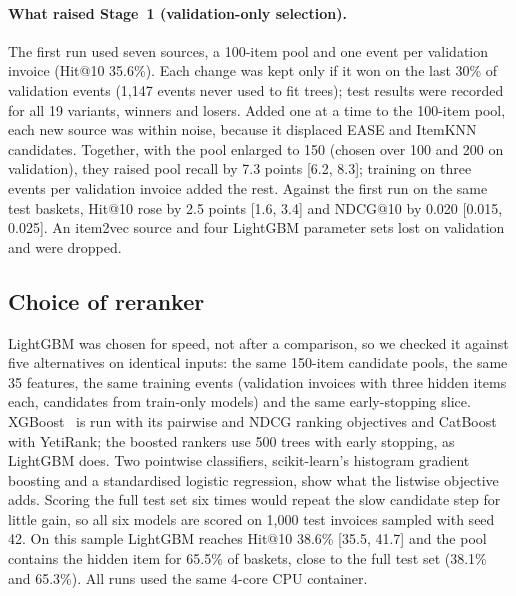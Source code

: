 \documentclass[11pt]{article}
\begin{document}
\paragraph{What raised Stage~1 (validation-only selection).}\label{sec:accuracy}
The first run used seven sources, a 100-item pool and one event per validation invoice (Hit@10 35.6\%).
Each change was kept only if it won on the last 30\% of validation events (1,147 events never used to fit trees); test results were recorded for all 19 variants, winners and losers.
Added one at a time to the 100-item pool, each new source was within noise, because it displaced EASE and ItemKNN candidates.
Together, with the pool enlarged to 150 (chosen over 100 and 200 on validation), they raised pool recall by 7.3 points [6.2, 8.3]; training on three events per validation invoice added the rest.
Against the first run on the same test baskets, Hit@10 rose by 2.5 points [1.6, 3.4] and NDCG@10 by 0.020 [0.015, 0.025].
An item2vec source and four LightGBM parameter sets lost on validation and were dropped.

\subsection{Choice of reranker}\label{sec:rerankers}
LightGBM was chosen for speed, not after a comparison, so we checked it against five alternatives on identical inputs: the same 150-item candidate pools, the same 35 features, the same training events (validation invoices with three hidden items each, candidates from train-only models) and the same early-stopping slice.
XGBoost~\citep{chen2016xgboost} is run with its pairwise and NDCG ranking objectives and CatBoost~\citep{prokhorenkova2018catboost} with YetiRank; the boosted rankers use 500 trees with early stopping, as LightGBM does.
Two pointwise classifiers, scikit-learn's histogram gradient boosting and a standardised logistic regression, show what the listwise objective adds.
Scoring the full test set six times would repeat the slow candidate step for little gain, so all six models are scored on 1,000 test invoices sampled with seed 42.
On this sample LightGBM reaches Hit@10 38.6\% [35.5, 41.7] and the pool contains the hidden item for 65.5\% of baskets, close to the full test set (38.1\% and 65.3\%).
All runs used the same 4-core CPU container.
\end{document}
